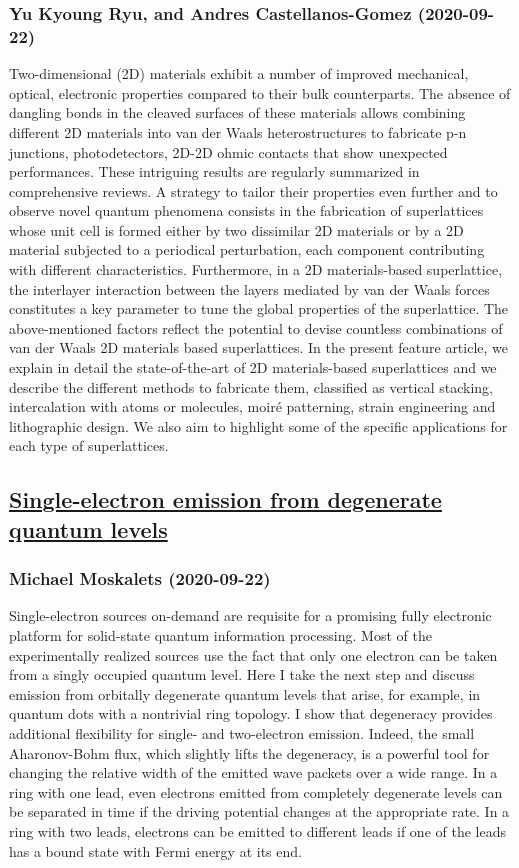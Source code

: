 {\subsubsection*{Yu Kyoung Ryu, and Andres Castellanos-Gomez (2020-09-22)}
Two-dimensional (2D) materials exhibit a number of improved mechanical,
optical, electronic properties compared to their bulk counterparts. The absence
of dangling bonds in the cleaved surfaces of these materials allows combining
different 2D materials into van der Waals heterostructures to fabricate p-n
junctions, photodetectors, 2D-2D ohmic contacts that show unexpected
performances. These intriguing results are regularly summarized in
comprehensive reviews. A strategy to tailor their properties even further and
to observe novel quantum phenomena consists in the fabrication of superlattices
whose unit cell is formed either by two dissimilar 2D materials or by a 2D
material subjected to a periodical perturbation, each component contributing
with different characteristics. Furthermore, in a 2D materials-based
superlattice, the interlayer interaction between the layers mediated by van der
Waals forces constitutes a key parameter to tune the global properties of the
superlattice. The above-mentioned factors reflect the potential to devise
countless combinations of van der Waals 2D materials based superlattices. In
the present feature article, we explain in detail the state-of-the-art of 2D
materials-based superlattices and we describe the different methods to
fabricate them, classified as vertical stacking, intercalation with atoms or
molecules, moir\'e patterning, strain engineering and lithographic design. We
also aim to highlight some of the specific applications for each type of
superlattices.

\subsection*{\href{http://arxiv.org/abs/2009.10500v1}{Single-electron emission from degenerate quantum levels}}
\subsubsection*{Michael Moskalets (2020-09-22)}
Single-electron sources on-demand are requisite for a promising fully
electronic platform for solid-state quantum information processing. Most of the
experimentally realized sources use the fact that only one electron can be
taken from a singly occupied quantum level. Here I take the next step and
discuss emission from orbitally degenerate quantum levels that arise, for
example, in quantum dots with a nontrivial ring topology. I show that
degeneracy provides additional flexibility for single- and two-electron
emission. Indeed, the small Aharonov-Bohm flux, which slightly lifts the
degeneracy, is a powerful tool for changing the relative width of the emitted
wave packets over a wide range. In a ring with one lead, even electrons emitted
from completely degenerate levels can be separated in time if the driving
potential changes at the appropriate rate. In a ring with two leads, electrons
can be emitted to different leads if one of the leads has a bound state with
Fermi energy at its end.

}
